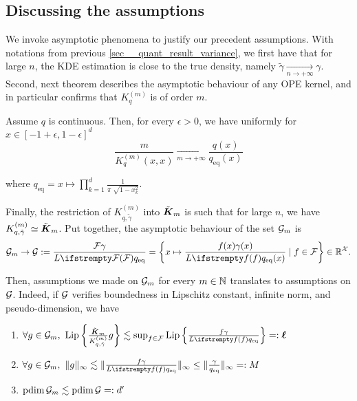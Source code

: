 \subsection{Discussing the assumptions}
We invoke asymptotic phenomena to justify our precedent assumptions. With notations from previous \cref{sec__quant_result_variance}, we first have that for large $n$, the KDE estimation is close to the true density, namely $\tilde \gamma \xrightarrow[n \to +\infty]{} \gamma$. Second, next theorem describes the asymptotic behaviour of any OPE kernel, and in particular confirms that $K_q^{(m)}$ is of order $m$.
\begin{tcolorbox}
	\begin{theorem}
		Assume $q$ is continuous. Then, for every $\epsilon>0$, we have uniformly for $x\in [-1+\epsilon,1-\epsilon]^d$
		\begin{equation}
			\frac{m}{K_q^{(m)}(x, x)} \xrightarrow[m \to +\infty]{} \frac{q(x)}{q_{\mathrm{eq}}(x)}
		\end{equation}
	\end{theorem}
	where $q_{\mathrm{eq}} = x \mapsto \prod_{k=1}^d \frac{1}{\pi \sqrt[]{1-x_k^2}}$.
\end{tcolorbox}

Finally, the restriction of $K^{(m)}_{q, \tilde \gamma}$ into $\tilde{\boldsymbol K}_{m}$ is such that for large $n$, we have $K^{(m)}_{q, \tilde \gamma} \simeq \tilde{\boldsymbol K}_{m}$. Put together, the asymptotic behaviour of the set $\mathcal{G}_m$ is 
\begin{equation}
	\twoqset_m \to \twoqset := \frac{\qset\gamma}{\loss{\qset}q_{\mathrm{eq}}} = \left\{x \mapsto \frac{\query(x)\gamma(x)}{\loss{\query}q_{\mathrm{eq}}(x)} \mid \query \in \qset\right\} \in \RR^{\mathcal{X}}.
\end{equation}


 Then, assumptions we made on $\mathcal{G}_m$ for every $m\in \mathbb{N}$ translates to assumptions on $\mathcal{G}$. Indeed, if $\mathcal{G}$ verifies boundedness in Lipschitz constant, infinite norm, and pseudo-dimension, we have
\begin{enumerate}
	\item $\forall \twoquery \in \twoqset_m,\ \operatorname{Lip}\left\{\frac{\opekernel{m}}{K^{(m)}_{q, \tilde \gamma}}\twoquery \right\} \lesssim \sup_{\query \in \qset}\operatorname{Lip}\left\{\frac{\query\gamma}{\loss{\query}q_{\mathrm{eq}}} \right\} =: \lipschitz$
	\item $\forall \twoquery \in \twoqset_m,\ \|\twoquery\|_{\infty} \lesssim \|\frac{\query\gamma}{\loss{\query}q_{\mathrm{eq}}}\|_{\infty} \leq \|\frac{\gamma}{q_{\mathrm{eq}}}\|_{\infty} =:  \bound$
	\item $\operatorname{pdim}\mathcal{G}_m \lesssim \operatorname{pdim}\mathcal{G} =: {d'}$
\end{enumerate}

